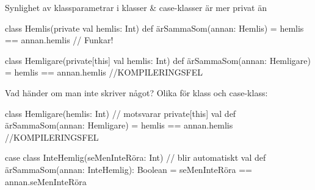 \begin{Slide}{Synlighet av klassparametrar i klasser \& case-klasser}\SlideFontSmall
{} är  mer privat än  
\begin{Code}
class Hemlis(private val hemlis: Int) {
  def ärSammaSom(annan: Hemlis) = hemlis == annan.hemlis   // Funkar!
}

class Hemligare(private[this] val hemlis: Int) {
  def ärSammaSom(annan: Hemligare) = hemlis == annan.hemlis //KOMPILERINGSFEL
}
\end{Code}
Vad händer om man inte skriver något? Olika för klass och case-klass:
\begin{Code}
class Hemligare(hemlis: Int) { // motsvarar private[this] val
  def ärSammaSom(annan: Hemligare) = hemlis == annan.hemlis //KOMPILERINGSFEL
}

case class InteHemlig(seMenInteRöra: Int) { // blir automatiskt val 
  def ärSammaSom(annan: InteHemlig): Boolean = 
    seMenInteRöra == annan.seMenInteRöra 
}

\end{Code}
\end{Slide}





